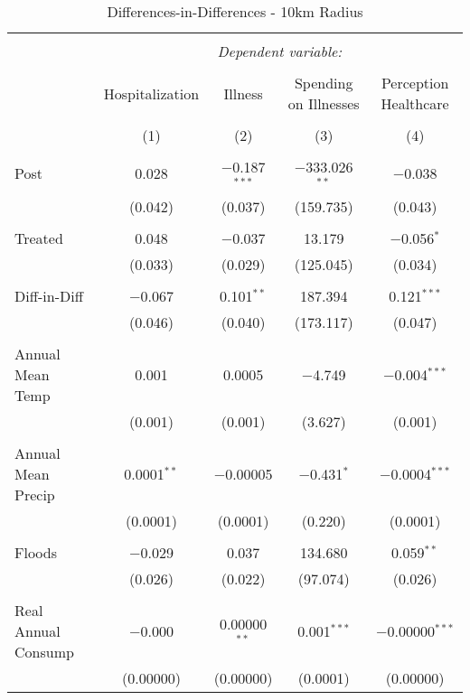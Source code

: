 
\begin{table}[!htbp] \centering 
  \caption{Differences-in-Differences - 10km Radius} 
  \label{} 
\begin{tabular}{@{\extracolsep{5pt}}lcccc} 
\\[-1.8ex]\hline 
\hline \\[-1.8ex] 
 & \multicolumn{4}{c}{\textit{Dependent variable:}} \\ 
\cline{2-5} 
\\[-1.8ex] & Hospitalization & Illness & Spending on Illnesses & Perception Healthcare \\ 
\\[-1.8ex] & (1) & (2) & (3) & (4)\\ 
\hline \\[-1.8ex] 
 Post & 0.028 & $-$0.187$^{***}$ & $-$333.026$^{**}$ & $-$0.038 \\ 
  & (0.042) & (0.037) & (159.735) & (0.043) \\ 
  & & & & \\ 
 Treated & 0.048 & $-$0.037 & 13.179 & $-$0.056$^{*}$ \\ 
  & (0.033) & (0.029) & (125.045) & (0.034) \\ 
  & & & & \\ 
 Diff-in-Diff & $-$0.067 & 0.101$^{**}$ & 187.394 & 0.121$^{***}$ \\ 
  & (0.046) & (0.040) & (173.117) & (0.047) \\ 
  & & & & \\ 
 Annual Mean Temp & 0.001 & 0.0005 & $-$4.749 & $-$0.004$^{***}$ \\ 
  & (0.001) & (0.001) & (3.627) & (0.001) \\ 
  & & & & \\ 
 Annual Mean Precip & 0.0001$^{**}$ & $-$0.00005 & $-$0.431$^{*}$ & $-$0.0004$^{***}$ \\ 
  & (0.0001) & (0.0001) & (0.220) & (0.0001) \\ 
  & & & & \\ 
 Floods & $-$0.029 & 0.037 & 134.680 & 0.059$^{**}$ \\ 
  & (0.026) & (0.022) & (97.074) & (0.026) \\ 
  & & & & \\ 
 Real Annual Consump & $-$0.000 & 0.00000$^{**}$ & 0.001$^{***}$ & $-$0.00000$^{***}$ \\ 
  & (0.00000) & (0.00000) & (0.0001) & (0.00000) \\ 

\end{tabular}
\end{table}
